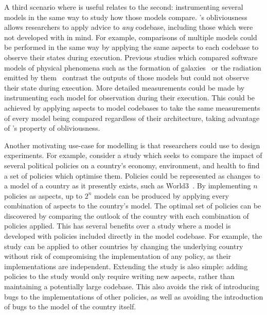 A third scenario where \aspectorientation{} is useful relates to the second:
instrumenting several models in the same way to study how those models compare.
\Aop{}'s obliviousness allows researchers to apply advice to \emph{any}
codebase, including those which were not developed with \aspectorientation{} in
mind. For example, comparisons of multiple models could be performed in the same
way by applying the same aspects to each codebase to observe their states during
execution. Previous studies which compared software models of physical phenomena
such as the formation of galaxies~\cite{comparison_of_galaxy_formation_models}
or the radiation emitted by
them~\cite{comparison_of_radiative_models_of_galaxies} contrast the outputs of
those models but could not observe their state during execution. More detailed
measurements could be made by instrumenting each model for observation during
their execution. This could be achieved by applying aspects to model codebases
to take the same measurements of every model being compared regardless of their
architecture, taking advantage of \aop{}'s property of obliviousness.


Another motivating use-case for \aspectoriented{} modelling is that researchers
could use \aop{} to design experiments. For example, consider a study which
seeks to compare the impact of several political policies on a country's
economy, environment, and health to find a set of policies which optimise them.
Policies could be represented as changes to a model of a country as it presently
exists, such as World3~\cite{meadows1972limits}. By implementing $n$ policies as aspects, up to $2^{n}$
models can be produced by applying every combination of aspects to the country's
model. The optimal set of policies can be discovered by comparing the outlook of
the country with each combination of policies applied. This has several benefits
over a study where a model is developed with policies included directly in the
model codebase. For example, the study can be applied to other countries by
changing the underlying country without risk of compromising the implementation
of any policy, as their implementations are independent. Extending the study is
also simple: adding policies to the study would only require writing new
aspects, rather than maintaining a potentially large codebase. This also avoids
the risk of introducing bugs to the implementations of other policies, as well
as avoiding the introduction of bugs to the model of the country itself. 

